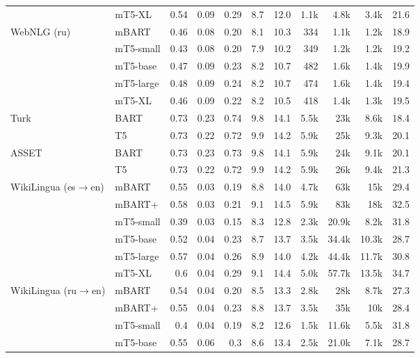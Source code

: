 \documentclass[11pt,a4paper]{article}
\begin{document}
\begin{table*}[!htbp]
\begin{tabular}{@{}llrrrrrrrrr@{}}
 & \small{mT5-XL} & 0.54 & 0.09 & 0.29 & 8.7 & 12.0 & 1.1k & 4.8k & 3.4k & 21.6 \\
\small{WebNLG (ru)} & \small{mBART} & 0.46 & 0.08 & 0.20 & 8.1 & 10.3 & 334 & 1.1k & 1.2k & 18.9 \\
 & \small{mT5-small} & 0.43 & 0.08 & 0.20 & 7.9 & 10.2 & 349 & 1.2k & 1.2k & 19.2 \\
 & \small{mT5-base} & 0.47 & 0.09 & 0.23 & 8.2 & 10.7 & 482 & 1.6k & 1.4k & 19.9 \\
 & \small{mT5-large} & 0.48 & 0.09 & 0.24 & 8.2 & 10.7 & 474 & 1.6k & 1.4k & 19.4 \\
 & \small{mT5-XL} & 0.46 & 0.09 & 0.22 & 8.2 & 10.5 & 418 & 1.4k & 1.3k & 19.5 \\
 \midrule
\multirow{2}{*}{Turk} & \small{BART} & 0.73 & 0.23 & 0.74 & 9.8 & 14.1 & 5.5k & 23k & 8.6k & 18.4 \\
 & \small{T5} & 0.73 & 0.22 & 0.72 & 9.9 & 14.2 & 5.9k & 25k  & 9.3k & 20.1 \\
\midrule
\multirow{2}{*}{ASSET} & \small{BART} & 0.73 & 0.23 & 0.73 & 9.8 & 14.1 & 5.9k & 24k & 9.1k & 20.1 \\
 & \small{T5} & 0.73 & 0.22 & 0.72 & 9.9 & 14.2 & 5.9k & 26k & 9.4k & 21.3 \\
\midrule
\multirow{2}{*}{WikiLingua (es$\rightarrow$en)} & \small{mBART} & 0.55 & 0.03 & 0.19 & 8.8 & 14.0 & 4.7k & 63k & 15k & 29.4 \\
 & \small{mBART+} & 0.58 & 0.03 & 0.21 & 9.1 & 14.5 & 5.9k & 83k & 18k & 32.5 \\
  & \small{mT5-small} & 0.39 & 0.03 & 0.15 & 8.3 & 12.8 & 2.3k & 20.9k & 8.2k & 31.8 \\
 & \small{mT5-base} & 0.52 & 0.04 & 0.23 & 8.7 & 13.7 & 3.5k & 34.4k & 10.3k & 28.7 \\
 & \small{mT5-large} & 0.57 & 0.04 & 0.26 & 8.9 & 14.0 & 4.2k & 44.4k & 11.7k & 30.8 \\
 & \small{mT5-XL} & 0.6 & 0.04 & 0.29 & 9.1 & 14.4 & 5.0k & 57.7k & 13.5k & 34.7 \\
\multirow{2}{*}{WikiLingua (ru$\rightarrow$en)} & \small{mBART} & 0.54 & 0.04 & 0.20 & 8.5 & 13.3 & 2.8k & 28k & 8.7k & 27.3 \\
 & \small{mBART+} & 0.55 & 0.04 & 0.23 & 8.8 & 13.7 & 3.5k & 35k & 10k & 28.4  \\
  & \small{mT5-small} & 0.4 & 0.04 & 0.19 & 8.2 & 12.6 & 1.5k & 11.6k & 5.5k & 31.8 \\
 & \small{mT5-base} & 0.55 & 0.06 & 0.3 & 8.6 & 13.4 & 2.5k & 21.0k & 7.1k & 28.7 \\

\end{tabular}
\end{table*}
\end{document}

